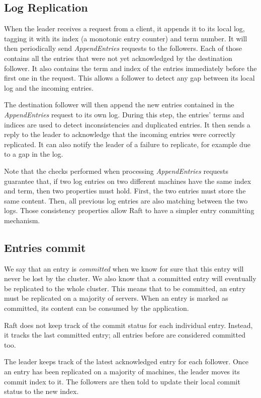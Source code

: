 \subsection{Log Replication}

When the leader receives a request from a client, it appends it to its local log, tagging it with its index (a monotonic entry counter) and term number.
It will then periodically send \emph{AppendEntries} requests to the followers.
Each of those contains all the entries that were not yet acknowledged by the destination follower.
It also contains the term and index of the entries immediately before the first one in the request.
This allows a follower to detect any gap between its local log and the incoming entries.

The destination follower will then append the new entries contained in the \emph{AppendEntries} request to its own log.
During this step, the entries' terms and indices are used to detect inconsistencies and duplicated entries.
It then sends a reply to the leader to acknowledge that the incoming entries were correctly replicated.
It can also notify the leader of a failure to replicate, for example due to a gap in the log.

Note that the checks performed when processing \emph{AppendEntries} requests guarantee that, if two log entries on two different machines have the same index and term, then two properties must hold\cite{raft}.
First, the two entries must store the same content.
Then, all previous log entries are also matching between the two logs.
Those consistency properties allow Raft to have a simpler entry committing mechanism.

\subsection{Entries commit}

We say that an entry is \emph{committed} when we know for sure that this entry will never be lost by the cluster.
We also know that a committed entry will eventually be replicated to the whole cluster.
This means that to be committed, an entry must be replicated on a majority of servers.
When an entry is marked as committed, its content can be consumed by the application.

Raft does not keep track of the commit status for each individual entry.
Instead, it tracks the last committed entry; all entries before are considered committed too.

The leader keeps track of the latest acknowledged entry for each follower.
Once an entry has been replicated on a majority of machines, the leader moves its commit index to it.
The followers are then told to update their local commit status to the new index.

